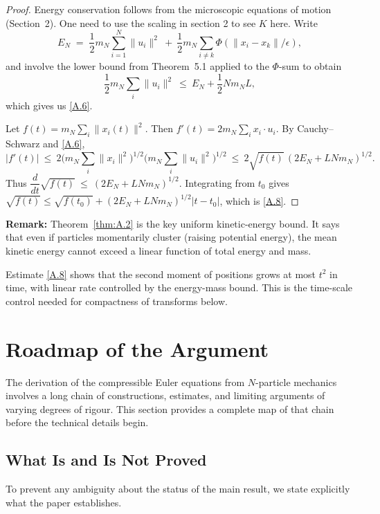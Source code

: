 \documentclass[11pt]{article}
\begin{document}
\begin{proof}
Energy conservation follows from the microscopic equations of motion (Section~2). One need to use the scaling in section 2 to see $K$ here.
Write
\[
E_N \;=\; \frac{1}{2}m_ N \sum_{i=1}^{N}\|u_i\|^2\ +\
\frac{1}{2}m_ N\sum_{i\neq k} \Phi(\|x_i-x_k\|/\epsilon),
\]
and involve the lower bound from Theorem~5.1 applied to the \(\Phi\)-sum to obtain
\[
\frac{1}{2}m_ N \sum_i \|u_i\|^2\ \le\ E_N + \frac{1}{2}Nm_ NL,
\]
which gives us \ref{A.6}.

 Let \(f(t)=m_ N\sum_i \|x_i(t)\|^2\).
Then \(f'(t)=2m_ N\sum_i x_i\cdot u_i\).
By Cauchy–Schwarz and \ref{A.6},
\[
|f'(t)|\ \le\ 2\Big(m_ N\sum_i \|x_i\|^2\Big)^{1/2}
\Big(m_ N\sum_i \|u_i\|^2\Big)^{1/2}
\ \le\ 2\sqrt{f(t)}\, (2E_N+LNm_N)^{1/2}.
\]
Thus \(\dfrac{d}{dt}\sqrt{f(t)}\ \le\ (2E_N+LNm_N)^{1/2}\).
Integrating from \(t_0\) gives \(\sqrt{f(t)}\le \sqrt{f(t_0)}+(2E_N+LNm_N)^{1/2}|t-t_0|\),
which is \eqref{A.8}.
\end{proof}

\textbf{Remark:}
Theorem~\ref{thm:A.2} is the key uniform kinetic-energy bound.
It says that even if particles momentarily cluster (raising potential energy),
the mean kinetic energy cannot exceed a linear function of total energy and mass.

Estimate \eqref{A.8} shows that the second moment of positions grows at most $t^2$ in time, with linear rate controlled by the energy-mass bound.
This is the time-scale control needed for compactness of transforms below.

\section{Roadmap of the Argument}\label{sec:roadmap}

The derivation of the compressible Euler equations from
$N$-particle mechanics involves a long chain of constructions,
estimates, and limiting arguments of varying degrees of rigour.
This section provides a complete map of that chain before the
technical details begin.


\subsection{What Is and Is Not Proved}

To prevent any ambiguity about the status of the main result,
we state explicitly what the paper establishes.
\end{document}
